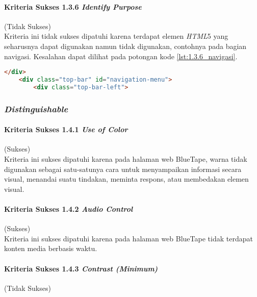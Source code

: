\paragraph{Kriteria Sukses 1.3.6 \textit{Identify Purpose}}
\label{par:kepatuhan_bluetape_kriteria_sukses_1.3.6}
(Tidak Sukses)\\

Kriteria ini tidak sukses dipatuhi karena terdapat elemen \textit{HTML}5 yang seharusnya dapat digunakan namun tidak digunakan, contohnya pada bagian navigasi. Kesalahan dapat dilihat pada potongan kode \ref{lst:1.3.6_navigasi}.

\begin{lstlisting}[frame=single, label={lst:1.3.6_navigasi}, language=HTML, caption=Kriteria Sukses 1.3.6 - Navigasi]
    </div>
    <div class="top-bar" id="navigation-menu">
        <div class="top-bar-left">
\end{lstlisting}

\subsubsection{\textit{Distinguishable}}
\label{subsubsec:kepatuhan_bluetape_distinguishable}

\paragraph{Kriteria Sukses 1.4.1 \textit{Use of Color}}
\label{par:kepatuhan_bluetape_kriteria_sukses_1.4.1}
(Sukses)\\

Kriteria ini sukses dipatuhi karena pada halaman web BlueTape, warna tidak digunakan sebagai satu-satunya cara untuk menyampaikan informasi secara visual, menandai suatu tindakan, meminta respons, atau membedakan elemen visual.

\paragraph{Kriteria Sukses 1.4.2 \textit{Audio Control}}
\label{par:kepatuhan_bluetape_kriteria_sukses_1.4.2}
(Sukses)\\

Kriteria ini sukses dipatuhi karena pada halaman web BlueTape tidak terdapat konten media berbasis waktu.

\paragraph{Kriteria Sukses 1.4.3 \textit{Contrast (Minimum)}}
\label{par:kepatuhan_bluetape_kriteria_sukses_1.4.3}
(Tidak Sukses)\\

